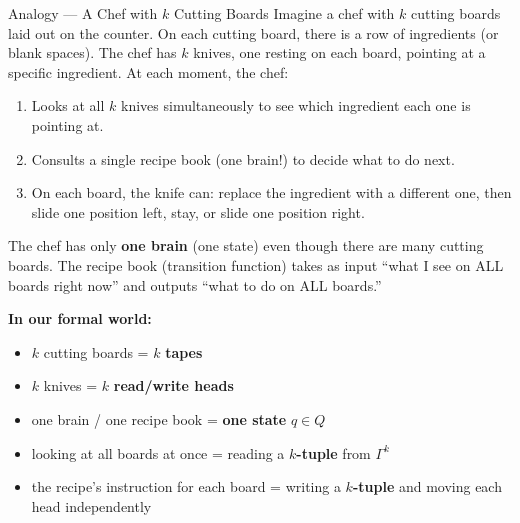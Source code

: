 \begin{notebox}{Analogy --- A Chef with $k$ Cutting Boards}
Imagine a chef with $k$ cutting boards laid out on the counter. On each cutting board, there is a row of ingredients (or blank spaces). The chef has $k$ knives, one resting on each board, pointing at a specific ingredient. At each moment, the chef:
\begin{enumerate}[nosep]
\item Looks at all $k$ knives simultaneously to see which ingredient each one is pointing at.
\item Consults a single recipe book (one brain!) to decide what to do next.
\item On each board, the knife can: replace the ingredient with a different one, then slide one position left, stay, or slide one position right.
\end{enumerate}

The chef has only \textbf{one brain} (one state) even though there are many cutting boards. The recipe book (transition function) takes as input ``what I see on ALL boards right now'' and outputs ``what to do on ALL boards.''

\textbf{In our formal world:}
\begin{itemize}[nosep]
\item $k$ cutting boards = $k$ \textbf{tapes}
\item $k$ knives = $k$ \textbf{read/write heads}
\item one brain / one recipe book = \textbf{one state} $q \in Q$
\item looking at all boards at once = reading a \textbf{$k$-tuple} from $\Gamma^k$
\item the recipe's instruction for each board = writing a \textbf{$k$-tuple} and moving each head independently
\end{itemize}
\end{notebox}

